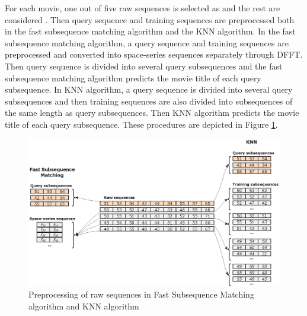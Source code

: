 For each movie, one out of five raw sequences is selected as  and the rest are considered .
Then query sequence and training sequences are preprocessed both in the fast subsequence matching algorithm and the KNN algorithm. 
In the fast subsequence matching algorithm, a query sequence and training sequences are preprocessed and converted into space-series sequences separately through DFFT.
Then query sequence is divided into several query subsequences and the fast subsequence matching algorithm predicts the movie title of each query subsequence. 
In KNN algorithm, a query sequence is divided into several query subsequences and then training sequences are also divided into subsequences of the same length as query subsequences. 
Then KNN algorithm predicts the movie title of each query subsequence. 
These procedures are depicted in Figure \ref{fig:train_test_set}.

\begin{figure}[!t]
\centering
\includegraphics[scale=0.60]{Figures/TrainTestSet}
\caption{Preprocessing of raw sequences in Fast Subsequence Matching algorithm and KNN algorithm}
\label{fig:train_test_set}
\end{figure}






